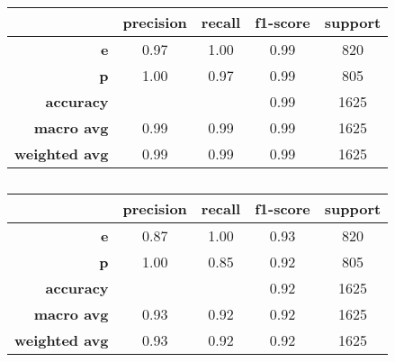 \begin{latin}
\begin{table}[h!]
  \begin{center}
    \caption{}
    \label{RNDFOR_TAB_5}
    \begin{tabular}{r|c|c|c|c} %
  & \textbf{precision}  & \textbf{recall} & \textbf{f1-score} & \textbf{support} \\
      \hline
           \textbf{e} & 0.97 & 1.00 & 0.99 & 820\\
           \textbf{p} & 1.00 & 0.97 & 0.99 & 805\\

    \textbf{accuracy} & & & 0.99 & 1625 \\
   \textbf{macro avg} & 0.99 & 0.99 & 0.99 & 1625 \\
\textbf{weighted avg} & 0.99 & 0.99 & 0.99 & 1625
    \end{tabular}
  \end{center}
\end{table}

\begin{table}[h!]
  \begin{center}
    \caption{}
    \label{RNDFOR_TAB_2}
    \begin{tabular}{r|c|c|c|c} %
  & \textbf{precision}  & \textbf{recall} & \textbf{f1-score} & \textbf{support} \\
      \hline
           \textbf{e} & 0.87 & 1.00 & 0.93 & 820\\
           \textbf{p} & 1.00 & 0.85 & 0.92 & 805\\

    \textbf{accuracy} & & & 0.92 & 1625 \\
   \textbf{macro avg} & 0.93 & 0.92 & 0.92 & 1625 \\
\textbf{weighted avg} & 0.93 & 0.92 & 0.92 & 1625
    \end{tabular}
  \end{center}
\end{table}
\end{latin}


